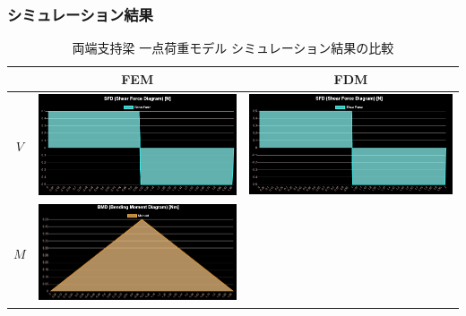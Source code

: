 \documentclass{jsarticle}
\begin{document}
\subsubsection{シミュレーション結果}
\begin{table}[H]
\begin{center}
\caption{両端支持梁 一点荷重モデル シミュレーション結果の比較}
\begin{tabular}{|c|c|c|}
\hline
 & FEM & FDM \\
\hline
\hline
$V$ &
\begin{minipage}{6truecm}
\centering
\includegraphics[width=6truecm]{simple_one_model_FEM_sf.PNG}
\end{minipage}
&
\begin{minipage}{6truecm}
\centering
\includegraphics[width=6truecm]{simple_one_model_FDM_sf.PNG}
\end{minipage}
\\
\hline
$M$ &
\begin{minipage}{6truecm}
\centering
\includegraphics[width=6cm]{simple_one_model_FEM_bm.PNG}

\end{minipage}
\end{tabular}
\end{center}
\end{table}
\end{document}
